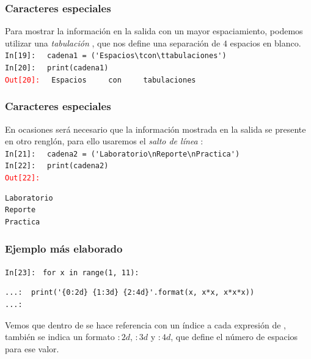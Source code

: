 \begin{frame}[fragile]
\frametitle{Caracteres especiales}
Para mostrar la información en la salida con un mayor espaciamiento, podemos utilizar una \emph{tabulación} , que nos define una separación de $4$ espacios en blanco.
\\
\bigskip
\pause
\textcolor{ao}{\texttt{In[19]: }} \verb| cadena1 = ('Espacios\tcon\ttabulaciones')|
\\
\pause
\textcolor{ao}{\texttt{In[20]: }} \verb| print(cadena1)|
\\
\pause
\textcolor{red}{\texttt{Out[20]: }} \verb| Espacios     con     tabulaciones|
\end{frame}
\begin{frame}[fragile]
\frametitle{Caracteres especiales}
En ocasiones será necesario que la información mostrada en la salida se presente en otro renglón, para ello usaremos el \emph{salto de línea} :
\\
\bigskip
\pause
\textcolor{ao}{\texttt{In[21]: }} \verb| cadena2 = ('Laboratorio\nReporte\nPractica')|
\\
\pause
\textcolor{ao}{\texttt{In[22]: }} \verb| print(cadena2)|
\\
\pause
\textcolor{red}{\texttt{Out[22]: }}
\fontsize{13}{13}\selectfont
\begin{verbatim}
Laboratorio
Reporte
Practica
\end{verbatim}
\end{frame}
\begin{frame}[fragile]
\frametitle{Ejemplo más elaborado}
{\fontsize{11}{11}\selectfont
\textcolor{ao}{\texttt{In[23]: }} \verb|for x in range(1, 11):|
\pause
\begin{verbatim}
...:  print('{0:2d} {1:3d} {2:4d}'.format(x, x*x, x*x*x))
...:
\end{verbatim}}
\pause
Vemos que dentro de  se hace referencia con un índice a cada expresión de , también se indica un formato $:2d$, $:3d$ y $:4d$, que define el número de espacios para ese valor.
\end{frame}
